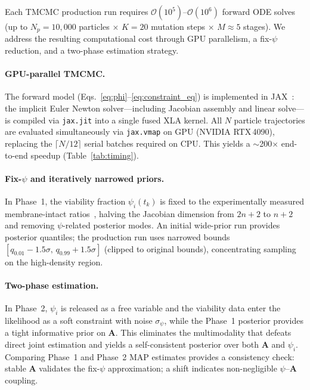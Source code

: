 \documentclass[11pt,a4paper]{article}
\begin{document}
Each TMCMC production run requires $\mathcal{O}(10^5)$--$\mathcal{O}(10^6)$ forward ODE solves (up to $N_p=10{,}000$ particles $\times$ $K=20$ mutation steps $\times$ $M\approx5$ stages).
We address the resulting computational cost through GPU parallelism, a fix-$\psi$ reduction, and a two-phase estimation strategy.

\paragraph{GPU-parallel TMCMC.}
The forward model (Eqs.~\ref{eq:phi}--\ref{eq:constraint_eq}) is implemented in JAX~\cite{jax2018github}: the implicit Euler Newton solver---including Jacobian assembly and linear solve---is compiled via \texttt{jax.jit} into a single fused XLA kernel.
All $N$ particle trajectories are evaluated simultaneously via \texttt{jax.vmap} on GPU (NVIDIA RTX\,4090), replacing the $\lceil N/12\rceil$ serial batches required on CPU.
This yields a $\sim$200$\times$ end-to-end speedup (Table~\ref{tab:timing}).

\paragraph{Fix-$\psi$ and iteratively narrowed priors.}
In Phase~1, the viability fraction $\psi_i(t_k)$ is fixed to the experimentally measured membrane-intact ratios~\cite{Heine2025PeriImplant}, halving the Jacobian dimension from $2n+2$ to $n+2$ and removing $\psi$-related posterior modes.
An initial wide-prior run provides posterior quantiles; the production run uses narrowed bounds $[q_{0.01}-1.5\sigma,\,q_{0.99}+1.5\sigma]$ (clipped to original bounds), concentrating sampling on the high-density region.

\paragraph{Two-phase estimation.}
In Phase~2, $\psi_i$ is released as a free variable and the viability data enter the likelihood as a soft constraint with noise $\sigma_\psi$, while the Phase~1 posterior provides a tight informative prior on $\mathbf{A}$.
This eliminates the multimodality that defeats direct joint estimation and yields a self-consistent posterior over both $\mathbf{A}$ and $\psi_i$.
Comparing Phase~1 and Phase~2 MAP estimates provides a consistency check: stable $\mathbf{A}$ validates the fix-$\psi$ approximation; a shift indicates non-negligible $\psi$--$\mathbf{A}$ coupling.
\end{document}
